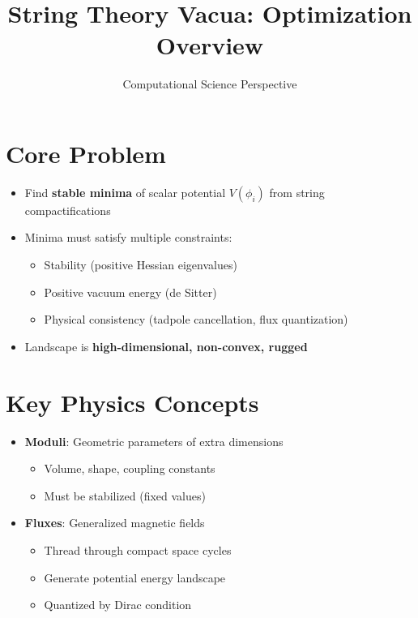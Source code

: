 \documentclass[12pt]{article}
\title{String Theory Vacua: Optimization Overview}
\author{Computational Science Perspective}
\date{}
\begin{document}
\maketitle

\section*{Core Problem}
\begin{itemize}
\item Find \textbf{stable minima} of scalar potential $V(\phi_i)$ from string compactifications
\item Minima must satisfy multiple constraints:
  \begin{itemize}
  \item Stability (positive Hessian eigenvalues)
  \item Positive vacuum energy (de Sitter)
  \item Physical consistency (tadpole cancellation, flux quantization)
  \end{itemize}
\item Landscape is \textbf{high-dimensional, non-convex, rugged}
\end{itemize}

\section*{Key Physics Concepts}
\begin{itemize}
\item \textbf{Moduli}: Geometric parameters of extra dimensions
  \begin{itemize}
  \item Volume, shape, coupling constants
  \item Must be stabilized (fixed values)
  \end{itemize}
\item \textbf{Fluxes}: Generalized magnetic fields
  \begin{itemize}
  \item Thread through compact space cycles
  \item Generate potential energy landscape
  \item Quantized by Dirac condition
  \end{itemize}
\end{itemize}
\end{document}
